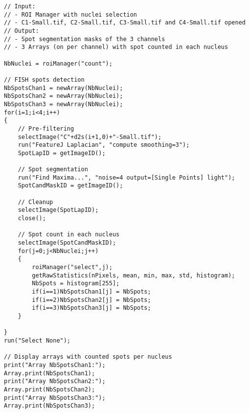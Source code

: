 \begin{lstlisting}
// Input: 
// - ROI Manager with nuclei selection
// - C1-Small.tif, C2-Small.tif, C3-Small.tif and C4-Small.tif opened
// Output: 
// - Spot segmentation masks of the 3 channels
// - 3 Arrays (on per channel) with spot counted in each nucleus

NbNuclei = roiManager("count");

// FISH spots detection
NbSpotsChan1 = newArray(NbNuclei);
NbSpotsChan2 = newArray(NbNuclei);
NbSpotsChan3 = newArray(NbNuclei);
for(i=1;i<4;i++)
{
	// Pre-filtering
	selectImage("C"+d2s(i+1,0)+"-Small.tif");
	run("FeatureJ Laplacian", "compute smoothing=3");
	SpotLapID = getImageID();
	
	// Spot segmentation
	run("Find Maxima...", "noise=4 output=[Single Points] light");
	SpotCandMaskID = getImageID();

	// Cleanup
	selectImage(SpotLapID);
	close();
	
	// Spot count in each nucleus
	selectImage(SpotCandMaskID);
	for(j=0;j<NbNuclei;j++)
	{ 	
		roiManager("select",j);
		getRawStatistics(nPixels, mean, min, max, std, histogram);
		NbSpots = histogram[255];
		if(i==1)NbSpotsChan1[j] = NbSpots;
		if(i==2)NbSpotsChan2[j] = NbSpots;
		if(i==3)NbSpotsChan3[j] = NbSpots;
	}
	
}
run("Select None");

// Display arrays with counted spots per nucleus
print("Array NbSpotsChan1:");
Array.print(NbSpotsChan1);
print("Array NbSpotsChan2:");
Array.print(NbSpotsChan2);
print("Array NbSpotsChan3:");
Array.print(NbSpotsChan3);
\end{lstlisting}